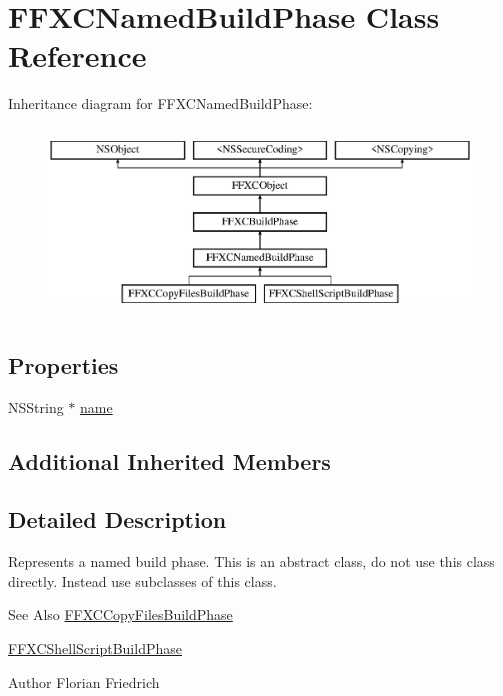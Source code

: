 \hypertarget{interface_f_f_x_c_named_build_phase}{\section{F\-F\-X\-C\-Named\-Build\-Phase Class Reference}
\label{interface_f_f_x_c_named_build_phase}
}
Inheritance diagram for F\-F\-X\-C\-Named\-Build\-Phase\-:\begin{figure}[H]
\begin{center}
\leavevmode
\includegraphics[height=5.000000cm]{interface_f_f_x_c_named_build_phase}
\end{center}
\end{figure}
\subsection*{Properties}
\begin{DoxyCompactItemize}
\item 
N\-S\-String $\ast$ \hyperlink{interface_f_f_x_c_named_build_phase_a4b93d352d2fca75b34e1b5a50e03f587}{name}
\end{DoxyCompactItemize}
\subsection*{Additional Inherited Members}


\subsection{Detailed Description}
Represents a named build phase. This is an abstract class, do not use this class directly. Instead use subclasses of this class. \begin{DoxySeeAlso}{See Also}
\hyperlink{interface_f_f_x_c_copy_files_build_phase}{F\-F\-X\-C\-Copy\-Files\-Build\-Phase} 

\hyperlink{interface_f_f_x_c_shell_script_build_phase}{F\-F\-X\-C\-Shell\-Script\-Build\-Phase} 
\end{DoxySeeAlso}
\begin{DoxyAuthor}{Author}
Florian Friedrich 
\end{DoxyAuthor}


